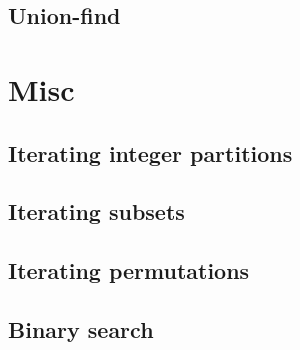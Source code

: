 \documentclass[a4paper,10pt]{article}
\begin{document}
\subsection{Union-find}

\newpage
\section{Misc}
\subsection{Iterating integer partitions}
\subsection{Iterating subsets}

\subsection{Iterating permutations}

\subsection{Binary search}


\end{document}
